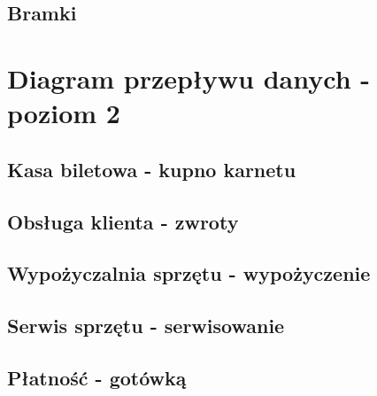 \documentclass{sprawozdanie-agh}
\begin{document}
\begin{landscape}
\newpage
\subsection{Bramki}
\begin{figure}
    
\end{figure}

\newpage
\section{Diagram przepływu danych - poziom 2}
\subsection{Kasa biletowa - kupno karnetu}
\begin{figure}
    
\end{figure}

\newpage
\subsection{Obsługa klienta - zwroty}
\begin{figure}
    
\end{figure}

\newpage
\subsection{Wypożyczalnia sprzętu - wypożyczenie}
\begin{figure}
    
\end{figure}

\newpage
\subsection{Serwis sprzętu - serwisowanie}
\begin{figure}
    
\end{figure}

\newpage
\subsection{Płatność - gotówką}
\begin{figure}
    
\end{figure}


\end{landscape}
\end{document}
